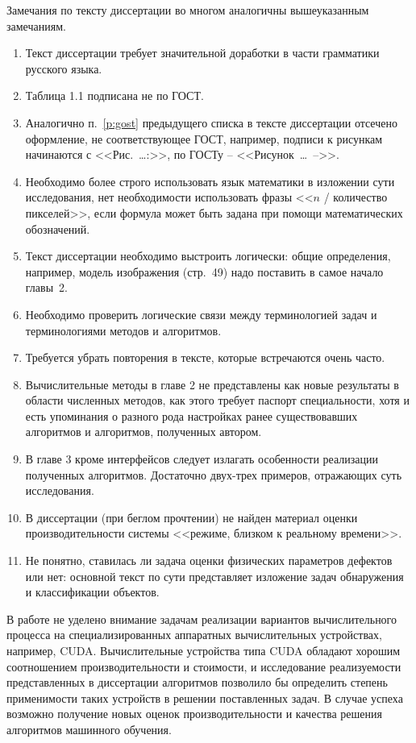\documentclass[12pt]{extarticle}
\begin{document}
Замечания по тексту диссертации во многом аналогичны вышеуказанным замечаниям.
\begin{enumerate}
\item Текст диссертации требует значительной доработки в части грамматики русского языка.
\item Таблица 1.1 подписана не по ГОСТ.
\item Аналогично п.~\ref{p:gost} предыдущего списка в тексте диссертации отсечено оформление, не соответствующее ГОСТ, например, подписи к рисункам начинаются с <<Рис.~\ldots:>>, по ГОСТу -- <<Рисунок~\ldots~-->>.
\item Необходимо более строго использовать язык математики в изложении сути исследования, нет необходимости использовать фразы <<$n$ / количество пикселей>>, если формула может быть задана при помощи математических обозначений.
\item Текст диссертации необходимо выстроить логически: общие определения, например, модель изображения (стр.~49) надо поставить в самое начало главы~2.
\item Необходимо проверить логические связи между терминологией задач и терминологиями методов и алгоритмов.
\item Требуется убрать повторения в тексте, которые встречаются очень часто.
\item Вычислительные методы в главе 2 не представлены как новые результаты в области численных методов, как этого требует паспорт специальности, хотя и есть упоминания о разного рода настройках ранее существовавших алгоритмов и алгоритмов, полученных автором.
\item В главе 3 кроме интерфейсов следует излагать особенности реализации полученных алгоритмов.  Достаточно двух-трех примеров, отражающих суть исследования.
\item В диссертации (при беглом прочтении) не найден материал оценки производительности системы <<режиме, близком к реальному времени>>.
\item Не понятно, ставилась ли задача оценки физических параметров дефектов или нет: основной текст по сути представляет изложение задач обнаружения и классификации объектов.
\end{enumerate}

В работе не уделено внимание задачам реализации вариантов вычислительного процесса на специализированных аппаратных вычислительных устройствах, например, CUDA.  Вычислительные устройства типа CUDA обладают хорошим соотношением производительности и стоимости, и исследование реализуемости представленных в диссертации алгоритмов позволило бы определить степень применимости таких устройств в решении поставленных задач.  В случае успеха возможно получение новых оценок производительности и качества решения алгоритмов машинного обучения.
\end{document}
